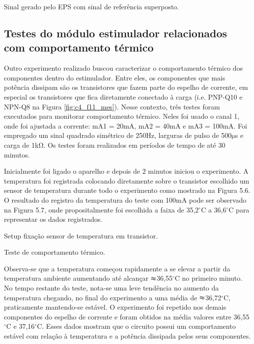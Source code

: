  Sinal  gerado  pelo  EPS  com  sinal  de  referência  superposto. 
 
 \subsection*{Testes  do  módulo  estimulador  relacionados  com  comportamento  térmico}
 
 Outro  experimento  realizado  buscou  caracterizar  o  comportamento  térmico  dos  componentes  dentro  do  estimulador.  Entre  eles,  os  componentes  que  mais  potência  dissipam  são  os  transistores  que  fazem  parte  do  espelho  de  corrente,  em  especial  os  transistores  que  fica  diretamente  conectado  à  carga  (i.e.  PNP-Q10  e  NPN-Q8  na  Figura  \ref{fig:c4_f11_mes}).  Nesse  contexto,  três  testes  foram  executados  para  monitorar  comportamento  térmico.  Neles  foi  usado  o  canal  1,  onde  foi  ajustada  a  corrente:  mA1  =  20mA,  mA2  =  40mA  e  mA3  =  100mA.  Foi  empregado  um  sinal  quadrado  simétrico  de  250Hz,  larguras  de  pulso  de  500$\mathrm{\mu}$s  e  carga  de  1k$\mathrm{\Omega}$.  Os  testes  foram  realizados  em  períodos  de  tempo  de  até  30  minutos.   
 
 Inicialmente  foi  ligado  o  aparelho  e  depois  de  2  minutos  iniciou  o  experimento.  A  temperatura  foi  registrada  colocando  diretamente  sobre  o  transistor  escolhido  um  sensor  de  temperatura  durante  todo  o  experimento  como  mostrado  na  Figura  5.6.  O  resultado  do  registro  da  temperatura  do  teste  com  100mA  pode  ser  observado  na  Figura  5.7,  onde  propositalmente  foi  escolhida  a  faixa  de  35,2$^{\circ}$C  a  36,6$^{\circ}$C  para  representar  os  dados  registrados. 

 Setup  fixação  sensor  de  temperatura  em  transistor. 
 
 Teste  de  comportamento  térmico.
 
 
 Observa-se  que  a  temperatura  começou  rapidamente  a  se  elevar  a  partir  da  temperatura  ambiente  aumentando  até  alcançar  $\mathbf{\thickapprox }$36,55$^{\circ}$C  no  primeiro  minuto.  No  tempo  restante  do  teste,  nota-se  uma  leve  tendência  no  aumento  da  temperatura  chegando,  no  final  do  experimento  a  uma  média  de  $\mathbf{\thickapprox}$36,72$^{\circ}$C,  praticamente  mantendo-se  estável.  O  experimento  foi  repetido  nos  demais  componentes  do espelho  de  corrente  e  foram  obtidos  na  média  valores  entre  36,55$^{\circ}$C  e  37,16$^{\circ}$C.  Esses  dados  mostram  que  o  circuito  possui  um  comportamento  estável  com  relação  à  temperatura  e  a  potência  dissipada  pelos  seus  componentes.  

